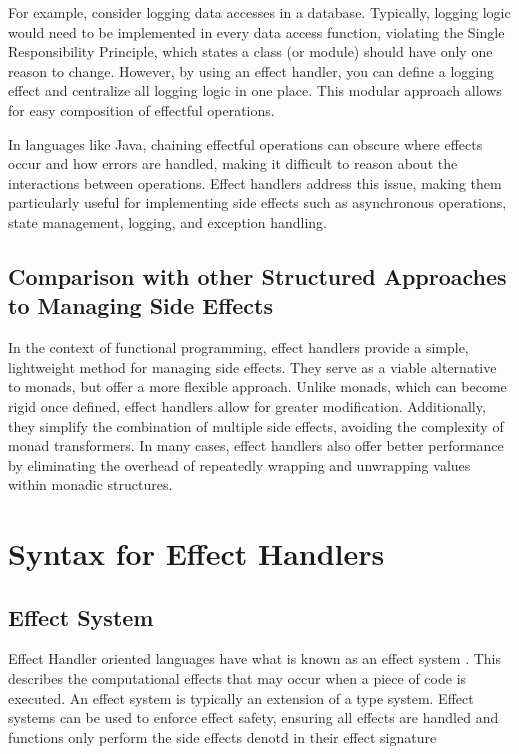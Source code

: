 \documentclass[logo,bsc,singlespacing,parskip]{infthesis}
\begin{document}
For example, consider logging data accesses in a database. Typically, logging logic would need to be implemented in every data access function, violating the Single Responsibility Principle, which states a class (or module) should have only one reason to change. However, by using an effect handler, you can define a logging effect and centralize all logging logic in one place. This modular approach allows for easy composition of effectful operations. 

In languages like Java, chaining effectful operations can obscure where effects occur and how errors are handled, making it difficult to reason about the interactions between operations. Effect handlers address this issue, making them particularly useful for implementing side effects such as asynchronous operations, state management, logging, and exception handling. 

\subsection{Comparison with other Structured Approaches to Managing Side Effects}


In the context of functional programming, effect handlers provide a simple, lightweight method for managing side effects. They serve as a viable alternative to monads, but offer a more flexible approach. Unlike monads, which can become rigid once defined, effect handlers allow for greater modification. Additionally, they simplify the combination of multiple side effects, avoiding the complexity of monad transformers. In many cases, effect handlers also offer better performance by eliminating the overhead of repeatedly wrapping and unwrapping values within monadic structures. 


\section{Syntax for Effect Handlers}

\subsection{Effect System}
Effect Handler oriented languages have what is known as an effect system \cite{bauer_effect_2013}. This describes the computational effects that may occur when a piece of code is executed. An effect system is typically an extension of a type system. Effect systems can be used to enforce effect safety, ensuring all effects are handled and functions only perform the side effects denotd in their effect signature
\end{document}
